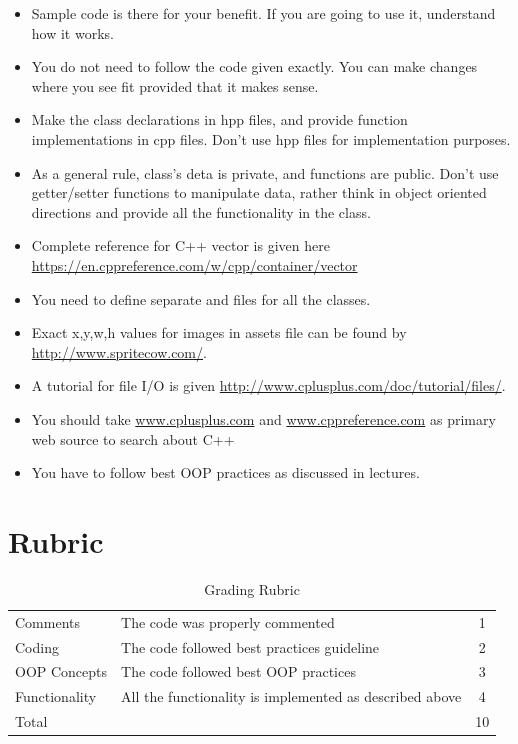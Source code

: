 \documentclass[a4paper,12pt]{article}
\begin{document}
	\begin{itemize}
		\item Sample code is there for your benefit. If you are going to use it, understand how it works. 
		\item You do not need to follow the code given exactly. You can make changes where you see fit provided that it makes sense.
		\item Make the class declarations in hpp files, and provide function implementations in cpp files. Don't use hpp files for implementation purposes.
		\item As a general rule, class's deta is private, and functions are public. Don't use getter/setter functions to manipulate data, rather think in object oriented directions and provide all the functionality in the class.
		\item Complete reference for C++ vector is given here \url{https://en.cppreference.com/w/cpp/container/vector}
		\item You need to define separate  and  files for all the classes.
		\item Exact x,y,w,h values for images in assets file can be found by \url{http://www.spritecow.com/}. 
		\item A tutorial for file I/O is given \url{http://www.cplusplus.com/doc/tutorial/files/}. 
		\item You should take \url{www.cplusplus.com} and \url{www.cppreference.com} as primary web source to search about C++
		\item You have to follow best OOP practices as discussed in lectures.
	\end{itemize}



		\section{Rubric}
	\begin{table}[!h]
		\centering
		\begin{tabular}{llc}
			\toprule
			Comments &	The code was properly commented	& 1 \\
			Coding	& The code followed best practices guideline &	2 \\
			OOP Concepts & The code followed best OOP practices & 3 \\
			Functionality	& All the functionality is implemented as described above	& 4 \\
			\midrule
			Total & & 10\\
			\bottomrule
		\end{tabular}
		\caption{Grading Rubric}
		\label{Grading}
	\end{table}


	\newpage
	
	
\end{document}
